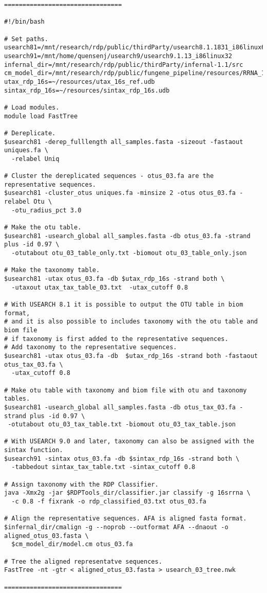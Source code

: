 \documentclass{article}
\begin{document}
\begin{verbatim}
================================

#!/bin/bash

# Set paths.
usearch81=/mnt/research/rdp/public/thirdParty/usearch8.1.1831_i86linux64
usearch91=/mnt/home/quensenj/usearch9/usearch9.1.13_i86linux32
infernal_dir=/mnt/research/rdp/public/thirdParty/infernal-1.1/src
cm_model_dir=/mnt/research/rdp/public/fungene_pipeline/resources/RRNA_16S_BACTERIA
utax_rdp_16s=~/resources/utax_16s_ref.udb
sintax_rdp_16s=~/resources/sintax_rdp_16s.udb

# Load modules.
module load FastTree

# Dereplicate.
$usearch81 -derep_fulllength all_samples.fasta -sizeout -fastaout uniques.fa \
  -relabel Uniq

# Cluster the dereplicated sequences - otus_03.fa are the representative sequences.
$usearch81 -cluster_otus uniques.fa -minsize 2 -otus otus_03.fa -relabel Otu \
  -otu_radius_pct 3.0

# Make the otu table.
$usearch81 -usearch_global all_samples.fasta -db otus_03.fa -strand plus -id 0.97 \
  -otutabout otu_03_table_only.txt -biomout otu_03_table_only.json

# Make the taxonomy table.
$usearch81 -utax otus_03.fa -db $utax_rdp_16s -strand both \
  -utaxout utax_tax_table_03.txt  -utax_cutoff 0.8

# With USEARCH 8.1 it is possible to output the OTU table in biom format,
# and it is also possible to includes taxonomy with the otu table and biom file
# if taxonomy is first added to the representative sequences. 
# Add taxonomy to the representative sequences.
$usearch81 -utax otus_03.fa -db  $utax_rdp_16s -strand both -fastaout otus_tax_03.fa \
  -utax_cutoff 0.8

# Make otu table with taxonomy and biom file with otu and taxonomy tables.
$usearch81 -usearch_global all_samples.fasta -db otus_tax_03.fa -strand plus -id 0.97 \
 -otutabout otu_03_tax_table.txt -biomout otu_03_tax_table.json

# With USEARCH 9.0 and later, taxonomy can also be assigned with the sintax function.
$usearch91 -sintax otus_03.fa -db $sintax_rdp_16s -strand both \
  -tabbedout sintax_tax_table.txt -sintax_cutoff 0.8

# Assign taxonomy with the RDP Classifier.
java -Xmx2g -jar $RDPTools_dir/classifier.jar classify -g 16srrna \
  -c 0.8 -f fixrank -o rdp_classified_03.txt otus_03.fa

# Align the representative sequences. AFA is aligned fasta format.
$infernal_dir/cmalign -g --noprob --outformat AFA --dnaout -o aligned_otus_03.fasta \
  $cm_model_dir/model.cm otus_03.fa

# Tree the aligned representatve sequences.
FastTree -nt -gtr < aligned_otus_03.fasta > usearch_03_tree.nwk

================================
\end{verbatim}
\end{document}
